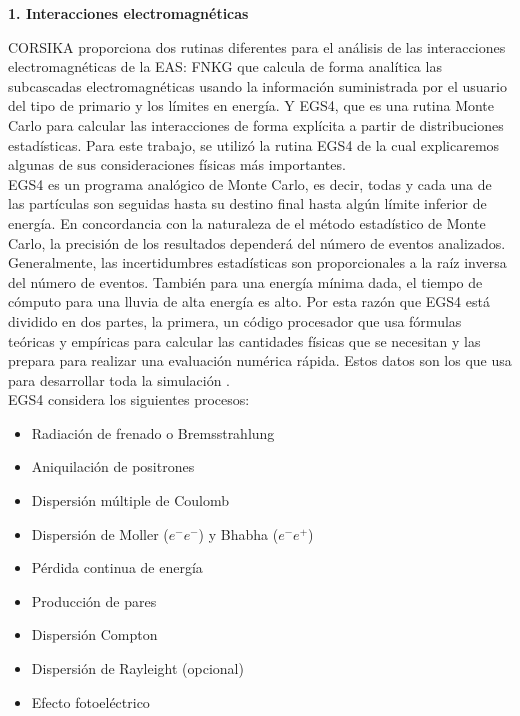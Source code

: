 \newpage
{}
\label{sec:apendiceA}

\noindent\textbf{1. Interacciones electromagn\'eticas}

CORSIKA proporciona dos rutinas diferentes para el análisis de las interacciones electromagnéticas de la EAS: FNKG que calcula de forma analítica las subcascadas electromagnéticas usando la información suministrada por el usuario del tipo de primario y los límites en energía. Y EGS4, que es una rutina Monte Carlo para calcular las interacciones de forma explícita a partir de distribuciones estadísticas. Para este trabajo, se utilizó la rutina EGS4 de la cual explicaremos algunas de sus consideraciones físicas más importantes.\\

EGS4 es un programa analógico de Monte Carlo, es decir, todas y cada una de las partículas son seguidas hasta su destino final hasta algún límite inferior de energía. En concordancia con la naturaleza de el método estadístico de Monte Carlo, la precisión de los resultados dependerá del número de eventos analizados. Generalmente, las incertidumbres estadísticas son proporcionales a la raíz inversa del número de eventos\citep{EGS4}. También para una energía mínima dada, el tiempo de cómputo para una lluvia de alta energía es alto. Por esta razón que EGS4 está dividido en dos partes, la primera, un código procesador que usa fórmulas teóricas y empíricas para calcular las cantidades físicas que se necesitan y las prepara para realizar una evaluación numérica rápida. Estos datos son los que usa para desarrollar toda la simulación \citep{EGS4}.\\

EGS4 considera los siguientes procesos:

\begin{itemize}
    \item Radiación de frenado o Bremsstrahlung
    \item Aniquilación de positrones
    \item Dispersión múltiple de Coulomb
    \item Dispersión de Moller ($e^{-}e^{-}$) y Bhabha ($e^{-}e^{+}$)
    \item Pérdida continua de energía
    \item Producción de pares
    \item Dispersión Compton
    \item Dispersión de Rayleight (opcional)
    \item Efecto fotoeléctrico
\end{itemize}{}

